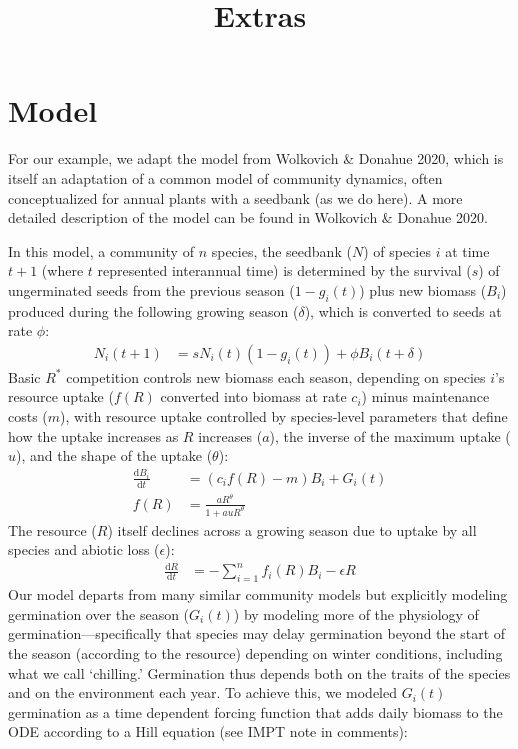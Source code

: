 \documentclass[11pt,letter]{article}
\begin{document}
\renewcommand{\refname}{\CHead{}}

\title{Extras} 

\renewcommand{\thetable}{S\arabic{table}}
\renewcommand{\thefigure}{S\arabic{figure}}

\section{Model} 
For our example, we adapt the model from Wolkovich \& Donahue 2020, which is itself an adaptation of a common model of community dynamics, often conceptualized for annual plants with a seedbank (as we do here). A more detailed description of the model can be found in Wolkovich \& Donahue 2020.

In this model, a community of \(n\) species, the seedbank ($N$) of species $i$ at time $t+1$ (where $t$ represented interannual time) is determined by the survival ($s$) of ungerminated seeds from the previous season ($1-g_{i}(t)$) plus new biomass ($B_i$) produced during the following growing season ($\delta$), which is converted to seeds at rate $\phi$:
\begin{align}
N_{i}(t+1) & =
s N_{i}(t)(1-g_{i}(t))+\phi B_{i}(t+\delta)
\end{align}
Basic $R^{*}$ competition controls new biomass each season, depending on species $i$'s resource uptake ($f(R)$ converted into biomass at rate $c_i$) minus maintenance costs ($m$), with resource uptake controlled by species-level parameters that define how the uptake increases as $R$ increases ($a$), the inverse of the maximum uptake ($u$), and the shape of the uptake ($\theta$):
\begin{align}
\frac{\mathrm{d}B_i}{\mathrm{d}t} & = (c_{i}f(R) - m)B_{i} + G_{i}(t)\\ %
f(R) & = \frac{a R^{\theta}}{1+a uR^{\theta}}
\end{align}
The resource ($R$) itself declines across a growing season due to uptake by all species and abiotic loss ($\epsilon$):
\begin{align}
\frac{\mathrm{d}R}{\mathrm{d}t} & = - \sum_{i=1}^{n}f_{i}(R)B_{i} -\epsilon R
\end{align}
Our model departs from many similar community models but explicitly modeling germination over the season ($G_{i}(t)$) by modeling more of the physiology of germination---specifically that species may delay germination beyond the start of the season (according to the resource) depending on winter conditions, including what we call `chilling.' Germination thus depends both on the traits of the species and on the environment each year. To achieve this, we modeled $G_{i}(t)$ germination as a time dependent forcing function that adds daily biomass to the ODE according to a Hill equation (see IMPT note in comments): %
\end{document}
